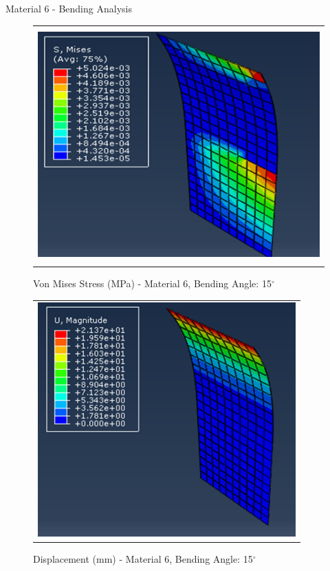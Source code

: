 \documentclass[a4paper,12pt]{article}
\numberwithin{equation}{section}
\numberwithin{figure}{section}
\begin{document}

\newpage
\noindent Material 6 - Bending Analysis 
\begin{figure}[H]
  \centering
  \begin{tabular}{@{}c@{}}
    \includegraphics[width=0.7\linewidth,height=255pt]{Results/Bending/M6_VMS_15_new.png} \\
  \end{tabular}
  \caption{Von Mises Stress (MPa) - Material 6,  Bending Angle: 15$^{\circ}$ }
\end{figure}

\begin{figure}[H]
  \centering
  \begin{tabular}{@{}c@{}}
    \includegraphics[width=0.7\linewidth,height=255pt]{Results/Bending/M6_DIS_15_new.png} \\
  \end{tabular}
  \caption{Displacement (mm) - Material 6, Bending Angle: 15$^{\circ}$ }
\end{figure}
\end{document}
